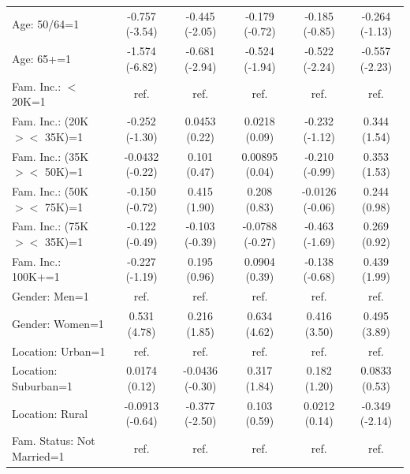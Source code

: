 \begin{landscape}
\begin{table}[here]
\begin{tabular}{l*{5}{c}}
Age: 50/64=1                   &-0.757\sym{***} (-3.54)         &-0.445\sym{*} (-2.05)         &-0.179 (-0.72)         &-0.185 (-0.85)         &-0.264 (-1.13)         \\
Age: 65+=1                    &-1.574\sym{***} (-6.82)         &-0.681\sym{**} (-2.94)         &-0.524 (-1.94)         &-0.522\sym{*} (-2.24)         &-0.557\sym{*} (-2.23)         \\
Fam. Inc.: $<$ 20K=1          &        ref.         &        ref.         &        ref.         &        ref.         &        ref.         \\
Fam. Inc.: (20K $> <$ 35K)=1  &-0.252 (-1.30)         &0.0453 (0.22)         &0.0218 (0.09)         &-0.232 (-1.12)         &0.344 (1.54)         \\
Fam. Inc.: (35K $> <$ 50K)=1  &-0.0432 (-0.22)         &0.101 (0.47)         &0.00895 (0.04)         &-0.210 (-0.99)         &0.353 (1.53)         \\
Fam. Inc.: (50K $> <$ 75K)=1  &-0.150 (-0.72)         &0.415 (1.90)         &0.208 (0.83)         &-0.0126 (-0.06)         &0.244 (0.98)         \\
Fam. Inc.: (75K $> <$ 35K)=1  &-0.122 (-0.49)         &-0.103 (-0.39)         &-0.0788 (-0.27)         &-0.463 (-1.69)         &0.269 (0.92)         \\
Fam. Inc.: 100K+=1            &-0.227 (-1.19)         &0.195 (0.96)         &0.0904 (0.39)         &-0.138 (-0.68)         &0.439\sym{*} (1.99)         \\
Gender: Men=1                 &        ref.         &        ref.         &        ref.         &        ref.         &        ref.         \\
Gender: Women=1               &0.531\sym{***} (4.78)         &0.216 (1.85)         &0.634\sym{***} (4.62)         &0.416\sym{***} (3.50)         &0.495\sym{***} (3.89)         \\
Location: Urban=1             &        ref.         &        ref.         &        ref.         &        ref.         &        ref.         \\
Location: Suburban=1          &0.0174 (0.12)         &-0.0436 (-0.30)         &0.317 (1.84)         &0.182 (1.20)         &0.0833 (0.53)         \\
Location: Rural               &-0.0913 (-0.64)         &-0.377\sym{*} (-2.50)         &0.103 (0.59)         &0.0212 (0.14)         &-0.349\sym{*} (-2.14)         \\
Fam. Status: Not Married=1    &        ref.         &        ref.         &        ref.         &        ref.         &        ref.         \\

\end{tabular}
\end{table}
\end{landscape}
